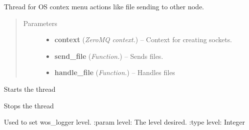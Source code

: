\documentclass[letterpaper,10pt,english]{sphinxmanual}
\begin{document}

\begin{fulllineitems}
\label{api:wos.SEND_FILE_CONTEX_MENU_HANDLER}
Thread for OS contex menu actions like file sending to other node.
\begin{quote}\begin{description}
\item[{Parameters}] \leavevmode\begin{itemize}
\item {} 
\textbf{context} (\emph{ZeroMQ context.}) -- Context for creating sockets.

\item {} 
\textbf{send\_file} (\emph{Function.}) -- Sends files.

\item {} 
\textbf{handle\_file} (\emph{Function.}) -- Handles files

\end{itemize}

\end{description}\end{quote}

\begin{fulllineitems}
\label{api:wos.SEND_FILE_CONTEX_MENU_HANDLER.run}
Starts the thread

\end{fulllineitems}


\begin{fulllineitems}
\label{api:wos.SEND_FILE_CONTEX_MENU_HANDLER.stop}
Stops the thread

\end{fulllineitems}


\end{fulllineitems}


\begin{fulllineitems}
\label{api:wos.SetLoggerLevel}
Used to set wos\_logger level.
:param level: The level desired.
:type level: Integer

\end{fulllineitems}
\end{document}
